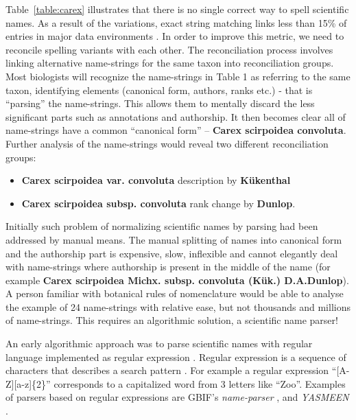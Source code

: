 \documentclass{bmcart}
\begin{document}
Table~\ref{table:carex} illustrates that
there is no single correct way to spell scientific names. As a result of the variations, exact string matching links less than 15\% of entries in major data
environments \cite{Patterson:inpress-a}. In order to improve this metric, we need to reconcile spelling variants with each other. The reconciliation process involves linking alternative name-strings for the same taxon into reconciliation
groups. Most biologists will recognize the name-strings in Table 1 as referring to the same taxon, identifying elements (canonical form, authors, ranks etc.) - that is ``parsing'' the name-strings.  This allows them to mentally discard the less significant parts such as annotations and authorship. It then becomes clear all of name-strings have a common ``canonical form'' -- \textbf{Carex scirpoidea convoluta}. Further
analysis of the name-strings would reveal two different reconciliation groups:

\begin{itemize}

  \item \textbf{Carex scirpoidea var. convoluta} description by
    \textbf{Kükenthal}

  \item \textbf{Carex scirpoidea subsp. convoluta} rank change by
    \textbf{Dunlop}.

\end{itemize}

  Initially such problem of normalizing scientific names by parsing had been
addressed by manual means. The manual splitting of names into
canonical form and the authorship part is expensive, slow, inflexible and
cannot elegantly deal with name-strings where authorship is present in the
middle of the name (for example \textbf{Carex scirpoidea Michx. subsp.
convoluta (Kük.) D.A.Dunlop}). A person familiar with botanical rules of
nomenclature would be able to analyse the example of 24 name-strings with
relative ease, but not thousands and millions of name-strings. This requires an
algorithmic solution, a scientific name parser!

An early algorithmic approach was to parse scientific names with regular
language implemented as regular expression \cite{Leary2007}. Regular expression
is a sequence of characters that describes a search pattern
\cite{aho1992foundations}.   For example a regular expression ``[A-Z][a-z]\{2\}'' corresponds
to a capitalized word from 3 letters like ``Zoo''. Examples of parsers based on
regular expressions are GBIF's \textit{name-parser} \cite{gbifNameParser}, and
\textit{YASMEEN} \cite{VandenBerghe2015}.
\end{document}
